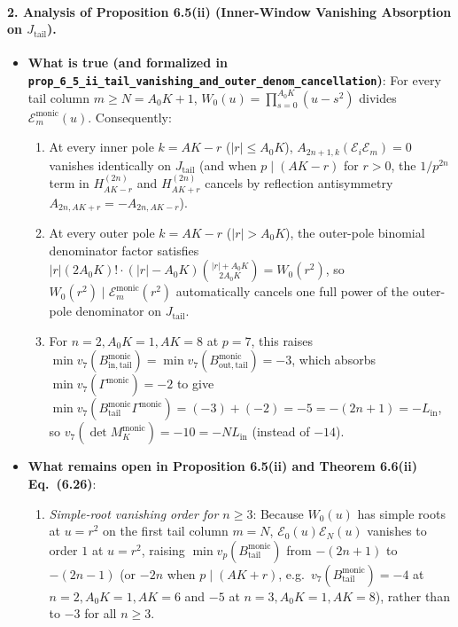 \documentclass[11pt,a4paper]{article}
\begin{document}
\paragraph{2. Analysis of Proposition 6.5(ii) (Inner-Window Vanishing Absorption on $J_{\mathrm{tail}}$).}
\begin{itemize}
  \item \textbf{What is true (and formalized in \texttt{prop\_6\_5\_ii\_tail\_vanishing\_and\_outer\_denom\_cancellation})}:
  For every tail column $m \ge N = A_0 K + 1$, $W_0(u) = \prod_{s=0}^{A_0 K}(u - s^2)$ divides $\mathcal{E}_m^{\mathrm{monic}}(u)$. Consequently:
  \begin{enumerate}
    \item At every inner pole $k = AK - r$ ($|r| \le A_0 K$), $A_{2n+1, k}(\mathcal{E}_i\mathcal{E}_m) = 0$ vanishes identically on $J_{\mathrm{tail}}$ (and when $p \mid (AK - r)$ for $r > 0$, the $1/p^{2n}$ term in $H_{AK-r}^{(2n)}$ and $H_{AK+r}^{(2n)}$ cancels by reflection antisymmetry $A_{2n, AK+r} = -A_{2n, AK-r}$).
    \item At every outer pole $k = AK - r$ ($|r| > A_0 K$), the outer-pole binomial denominator factor satisfies $|r|(2A_0 K)!\cdot(|r| - A_0 K)\binom{|r|+A_0 K}{2A_0 K} = W_0(r^2)$, so $W_0(r^2) \mid \mathcal{E}_m^{\mathrm{monic}}(r^2)$ automatically cancels one full power of the outer-pole denominator on $J_{\mathrm{tail}}$.
    \item For $n = 2, A_0 K = 1, AK = 8$ at $p = 7$, this raises $\min v_7(B_{\mathrm{in,tail}}^{\mathrm{monic}}) = \min v_7(B_{\mathrm{out,tail}}^{\mathrm{monic}}) = -3$, which absorbs $\min v_7(\Gamma^{\mathrm{monic}}) = -2$ to give $\min v_7(B_{\mathrm{tail}}^{\mathrm{monic}}\Gamma^{\mathrm{monic}}) = (-3) + (-2) = -5 = -(2n+1) = -L_{\mathrm{in}}$, so $v_7(\det M_K^{\mathrm{monic}}) = -10 = -N L_{\mathrm{in}}$ (instead of $-14$).
  \end{enumerate}
  \item \textbf{What remains open in Proposition 6.5(ii) and Theorem 6.6(ii) Eq.\ (6.26)}:
  \begin{enumerate}
    \item \emph{Simple-root vanishing order for $n \ge 3$}: Because $W_0(u)$ has simple roots at $u = r^2$ on the first tail column $m = N$, $\mathcal{E}_0(u)\mathcal{E}_N(u)$ vanishes to order $1$ at $u = r^2$, raising $\min v_p(B_{\mathrm{tail}}^{\mathrm{monic}})$ from $-(2n+1)$ to $-(2n-1)$ (or $-2n$ when $p \mid (AK + r)$, e.g.\ $v_7(B_{\mathrm{tail}}^{\mathrm{monic}}) = -4$ at $n=2, A_0 K=1, AK=6$ and $-5$ at $n=3, A_0 K=1, AK=8$), rather than to $-3$ for all $n \ge 3$.

\end{enumerate}
\end{itemize}
\end{document}
